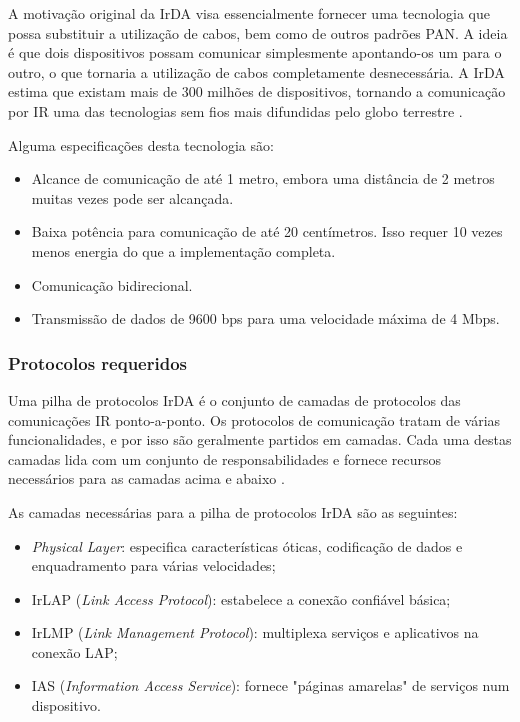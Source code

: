 \documentclass[conference]{IEEEtran}
\begin{document}
A motivação original da IrDA visa essencialmente fornecer uma tecnologia que possa substituir a utilização de cabos, bem como de outros padrões PAN. 
A ideia é que dois dispositivos possam comunicar simplesmente apontando-os um para o outro, o que tornaria a utilização de cabos completamente desnecessária. 
A IrDA estima que existam mais de 300 milhões de dispositivos, tornando a comunicação por IR uma das tecnologias sem fios mais difundidas pelo globo terrestre \cite{wpanonline}.

Alguma especificações desta tecnologia são:

\begin{itemize}

 \item Alcance de comunicação de até 1 metro, embora uma distância de 2 metros muitas vezes pode ser alcançada.
 \item Baixa potência para comunicação de até 20 centímetros. Isso requer 10 vezes menos energia do que a implementação completa.
 \item Comunicação bidirecional.
 \item Transmissão de dados de 9600 bps para uma velocidade máxima de 4 Mbps.

\end{itemize}

\subsubsection{Protocolos requeridos}

Uma pilha de protocolos IrDA é o conjunto de camadas de protocolos das comunicações IR ponto-a-ponto. 
Os protocolos de comunicação tratam de várias funcionalidades, e por isso são geralmente partidos em camadas. 
Cada uma destas camadas lida com um conjunto de responsabilidades e fornece recursos necessários para as camadas acima e abaixo \cite{megowan1996irda}.

As camadas necessárias para a pilha de protocolos IrDA são as seguintes:

\begin{itemize}

 \item \textit{Physical Layer}: especifica características óticas, codificação de dados e enquadramento para várias velocidades;
 \item IrLAP (\textit{Link Access Protocol}): estabelece a conexão confiável básica;
 \item IrLMP (\textit{Link Management Protocol}): multiplexa serviços e aplicativos na conexão LAP;
 \item IAS (\textit{Information Access Service}): fornece "páginas amarelas" de serviços num dispositivo.

\end{itemize}
\end{document}
